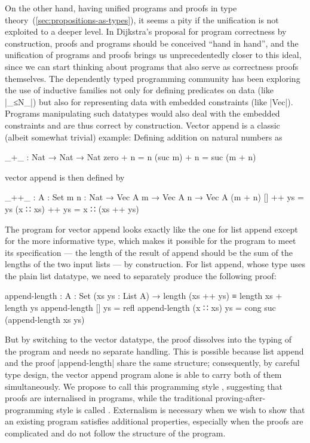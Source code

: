 On the other hand, having unified programs and proofs in type theory~(\autoref{sec:propositions-as-types}), it seems a pity if the unification is not exploited to a deeper level.
In Dijkstra's proposal for program correctness by construction, proofs and programs should be conceived ``hand in hand'', and the unification of programs and proofs brings us unprecedentedly closer to this ideal, since we can start thinking about programs that also serve as correctness proofs themselves.
The dependently typed programming community has been exploring the use of inductive families not only for defining predicates on data (like |_≤N_|) but also for representing data with embedded constraints (like |Vec|).
Programs manipulating such datatypes would also deal with the embedded constraints and are thus correct by construction.
Vector append is a classic (albeit somewhat trivial) example:
Defining addition on natural numbers as
\begin{code}
_+_ : Nat → Nat → Nat
zero     + n = n
(suc m)  + n = suc (m + n)
\end{code}
vector append is then defined by
\begin{code}
_++_ : {A : Set} {m n : Nat} → Vec A m → Vec A n → Vec A (m + n)
[]        ++ ys = ys
(x ∷ xs)  ++ ys = x ∷ (xs ++ ys)
\end{code}
The program for vector append looks exactly like the one for list append except for the more informative type, which makes it possible for the program to meet its specification --- the length of the result of append should be the sum of the lengths of the two input lists --- by construction.
For list append, whose type uses the plain list datatype, we need to separately produce the following proof:
\begin{code}
append-length :
  {A : Set} (xs ys : List A) → length (xs ++ ys) ≡ length xs + length ys
append-length []        ys = refl
append-length (x ∷ xs)  ys = cong suc (append-length xs ys)
\end{code}
But by switching to the vector datatype, the proof dissolves into the typing of the program and needs no separate handling.
This is possible because list append and the proof |append-length| share the same structure; consequently, by careful type design, the vector append program alone is able to carry both of them simultaneously.
We propose to call this programming style , suggesting that proofs are internalised in programs, while the traditional proving-after-programming style is called .
Externalism is necessary when we wish to show that an existing program satisfies additional properties, especially when the proofs are complicated and do not follow the structure of the program.
